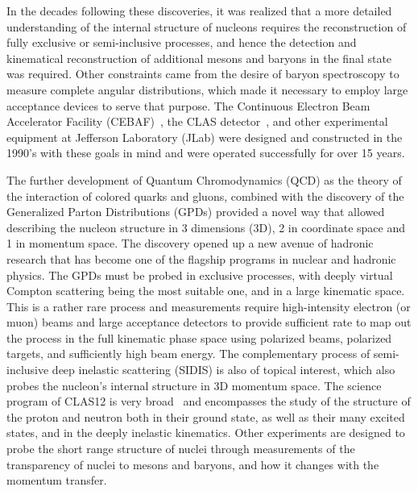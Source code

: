 \documentclass[final,3p,twocolumn]{elsarticle}
\begin{document}
In the decades following these discoveries, it was realized that a more detailed understanding of the internal
structure of nucleons requires the reconstruction of fully exclusive or semi-inclusive processes, and hence the
detection and kinematical reconstruction of additional mesons and baryons in the final state was required.  Other
constraints came from the desire of baryon spectroscopy to measure complete angular distributions, which made it
necessary to employ large acceptance devices to serve that purpose. The Continuous Electron Beam Accelerator
Facility (CEBAF)~\cite{Leemann:2001dg}, the CLAS detector~\cite{Mecking:2003zu}, and other experimental
equipment at Jefferson Laboratory (JLab) were designed and constructed in the 1990's with these goals in mind
and were operated successfully for over 15 years. 

The further development of Quantum Chromodynamics (QCD) as the theory of the interaction of colored quarks and
gluons, combined with the discovery of the Generalized Parton Distributions (GPDs) provided a novel way that allowed
describing the nucleon structure in 3 dimensions (3D), 2 in coordinate space and 1 in momentum space. The discovery
opened up a new avenue of hadronic research that has become one of the flagship programs in nuclear and hadronic
physics. The GPDs must be probed in exclusive processes, with deeply virtual Compton scattering being the most
suitable one, and in a large kinematic space. This is a rather rare process and measurements require high-intensity
electron (or muon) beams and large acceptance detectors to provide sufficient rate to map out the process in the full
kinematic phase space using polarized beams, polarized targets, and sufficiently high beam energy. The complementary
process of semi-inclusive deep inelastic scattering (SIDIS) is also of topical interest,  which also probes the nucleon's
internal structure in 3D momentum space. The science program of CLAS12 is very broad~\cite{Burkert:2018nvj} and
encompasses the study of the structure of the proton and neutron both in their ground state, as well as their many
excited states, and in the deeply inelastic kinematics. Other experiments are designed to probe the short range
structure of nuclei through measurements of the transparency of nuclei to mesons and baryons, and how it changes
with the momentum transfer.   
\end{document}
